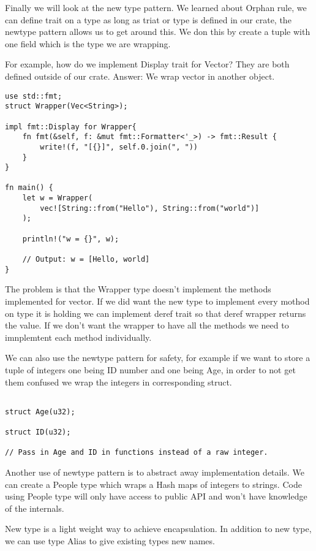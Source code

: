 Finally we will look at the new type pattern.  We learned about Orphan rule, we can define trait on a type as long as triat or type is defined in our crate, the newtype pattern allows us to get around this. We don this by create a tuple with one field which is the type we are wrapping.

For example, how do we implement Display trait for Vector? They are both defined outside of our crate. Answer: We wrap vector in another object.

\begin{lstlisting}
use std::fmt;
struct Wrapper(Vec<String>);

impl fmt::Display for Wrapper{
    fn fmt(&self, f: &mut fmt::Formatter<'_>) -> fmt::Result {
        write!(f, "[{}]", self.0.join(", "))
    }
}

fn main() {
    let w = Wrapper(
        vec![String::from("Hello"), String::from("world")]
    );

    println!("w = {}", w);

    // Output: w = [Hello, world]
}

\end{lstlisting}

The problem is that the Wrapper type doesn't implement the methods implemented for vector. If we did want the new type to implement every mothod on type it is holding we can implement deref trait so that deref wrapper returns the value. If we don't want the wrapper to have all the methods we need to imnplemtent each method individually.

We can also use the newtype pattern for safety, for example if we want to store a tuple of integers one being ID number and one being Age, in order to not get them confused we wrap the integers in corresponding struct.

\begin{lstlisting}
    
struct Age(u32);

struct ID(u32);

// Pass in Age and ID in functions instead of a raw integer.
\end{lstlisting}

Another use of newtype pattern is to abstract away implementation details. We can create a People type which wraps a Hash maps of integers to strings. Code using People type will only have access to public API and won't have knowledge of the internals.

New type is a light weight way to achieve encapsulation. In addition to new type, we can use type Alias to give existing types new names.


